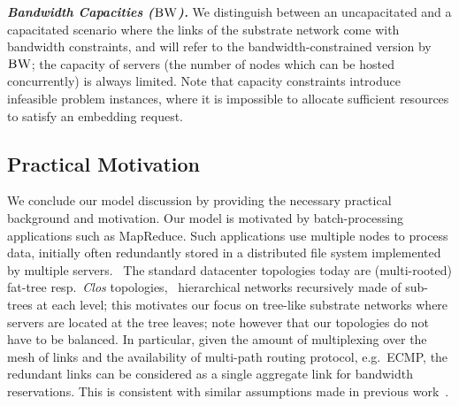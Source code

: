 \documentclass[9pt]{sigcomm-alternate}
\newcommand{\maciek}[1]{\textcolor{brown}{maciek: #1}}
\newcommand{\BW}{\textsc{BW}}
\begin{document}
\textbf{\emph{Bandwidth Capacities ($\BW$).}}
We distinguish between an uncapacitated and a capacitated scenario where the links
of the substrate network come with bandwidth
constraints, and will refer to the bandwidth-constrained version by $\BW$; the capacity of servers
(the number of nodes which can be hosted concurrently) is always limited.
Note that capacity constraints introduce infeasible problem instances, where it is impossible to
allocate sufficient resources to satisfy an embedding request.


\subsection{Practical Motivation}\label{ssec:practice}

We conclude our model discussion by providing the necessary practical background and motivation.
Our model is motivated by batch-processing applications such as MapReduce.
Such applications use multiple nodes to
process data, initially often redundantly stored in a distributed file system implemented
by multiple servers.~\cite{mapreduce}
The standard datacenter topologies today are (multi-rooted) fat-tree resp.~\emph{Clos} topologies,~\cite{fattree,vl2}
hierarchical networks  recursively made of sub-trees at each level; this motivates our
focus on tree-like substrate networks where servers are located at the
tree leaves; note however that our topologies do not have to be balanced. In particular, given the amount of multiplexing over the mesh of links
and the availability of multi-path routing protocol, e.g.~ECMP, the redundant
links can be considered as a single aggregate link for bandwidth
reservations. This is consistent with similar assumptions made in
previous work~\cite{oktopus,proteus}.
\end{document}

